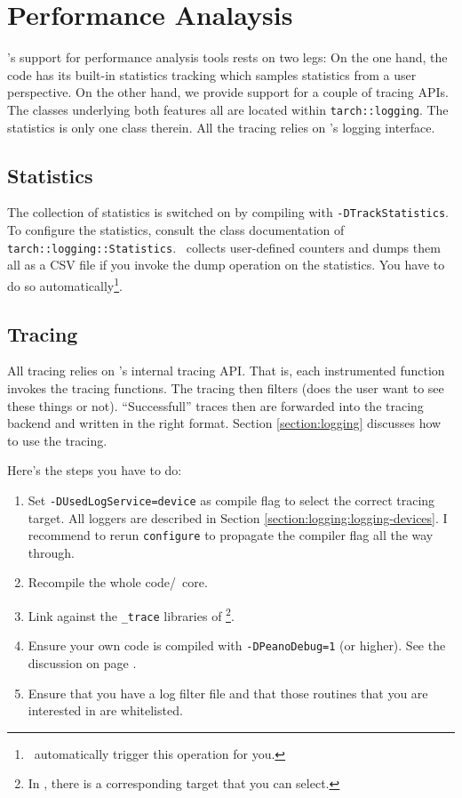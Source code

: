\chapter{Performance Analaysis}
\label{capter:performance-analysis}


\Peano's support for performance analysis tools rests on two legs:
On the one hand, the code has its built-in statistics tracking which samples
statistics from a user perspective.
On the other hand, we provide support for a couple of tracing APIs.
The classes underlying both features all are located within
\texttt{tarch::logging}.
The statistics is only one class therein.
All the tracing relies on \Peano's logging interface.


\section{Statistics}

The collection of statistics is switched on by compiling with
\texttt{-DTrackStatistics}.
To configure the statistics, consult the class documentation of
\texttt{tarch::logging::Statistics}.
\Peano\ collects user-defined counters and dumps them all as a CSV file if you
invoke the dump operation on the statistics. 
You have to do so automatically\footnote{\ExaHyPE\ automatically trigger this
operation for you.}.



\section{Tracing}


All tracing relies on \Peano's internal tracing API.
That is, each instrumented function invokes the tracing functions.
The tracing then filters (does the user want to see these things or not).
``Successfull'' traces then are forwarded into the tracing backend and written
in the right format.
Section \ref{section:logging} discusses how to use the tracing.


Here's the steps you have to do:
\begin{enumerate}
  \item Set \texttt{-DUsedLogService=device} as compile flag to select the
  correct tracing target. All loggers are described in Section
  \ref{section:logging:logging-devices}. I recommend to rerun \texttt{configure}
  to propagate the compiler flag all the way through.
  \item Recompile the whole code/\Peano\ core.
  \item Link against the \texttt{\_trace} libraries of \Peano\footnote{In
  \ExaHyPE, there is a corresponding target that you can select.}.
  \item Ensure your own code is compiled with \texttt{-DPeanoDebug=1} (or
  higher). See the discussion on page \pageref{section:logging}.
  \item Ensure that you have a log filter file and that those routines that you
  are interested in are whitelisted.
\end{enumerate}





